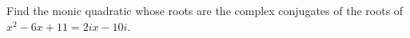 Find the monic quadratic whose roots are the complex conjugates of the roots of $x^2-6x+11=2ix-10i$.
